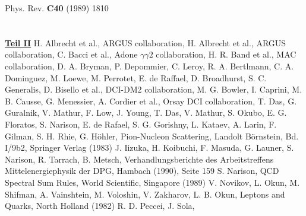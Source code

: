 \begin{thebibliography}{ABC.99}
	      Phys. Rev. {\bf C40} (1989) 1810\\
	      \\  \\
	      \underline{\LARGE\bf Teil II}
 H. Albrecht et al., ARGUS collaboration, 
 H. Albrecht et al., ARGUS collaboration, 
 C. Bacci et al., Adone $\gamma\gamma 2$
              collaboration, 
 H. R. Band et al., MAC collaboration,
 D. A. Bryman, P. Depommier, C. Leroy, 
 R. A. Bertlmann, C. A. Dominguez, M. Loewe,
              M. Perrotet, E. de Raffael,  
 D. Broadhurst, S. C. Generalis, 
 D. Bisello et al., DCI-DM2 collaboration, 
 M. G. Bowler,  	      
 I. Caprini, 
 M. B. Causse, G. Menessier, 
 A. Cordier et al., Orsay DCI collaboration,
 T. Das, G. Guralnik, V. Mathur, F. Low, J. Young,
 T. Das, V. Mathur, S. Okubo,   	      
 E. G. Floratos, S. Narison, E. de Rafael,
 S. G. Gorishny, L. Kataev, A. Larin,
 F. Gilman, S. H. Rhie,     
 G. H\"ohler, Pion-Nucleon Scattering,
              Landolt B\"ornstein, Bd. I/9b2, Springer Verlag (1983)        
 J. Iizuka, H. Koibuchi, F. Masuda, 
 G. Launer, S. Narison, R. Tarrach, 
 B. Metsch, Verhandlungsberichte des Arbeitstreffens
              Mittelenergiephysik der DPG, Hambach (1990), Seite 159
 S. Narison, QCD Spectral Sum Rules, World
              Scientific, Singapore (1989)
 V. Novikov, L. Okun, M. Shifman, A. Vainshtein, 
              M. Voloshin, V. Zakharov, 	 
 L. B. Okun, Leptons and Quarks, North Holland (1982)           
 R. D. Peccei, J. Sola, 	      

\end{thebibliography}
